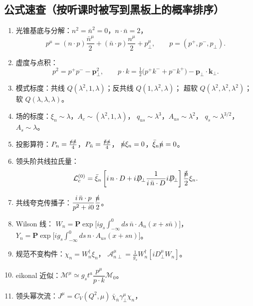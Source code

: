 \documentclass[UTF8,a4paper,11pt]{ctexart}
\theoremstyle{definition}
\theoremstyle{remark}
\theoremstyle{plain}
\newcommand{\nsl}{n\mkern-10.5mu/\mkern1.5mu}
\newcommand{\nbsl}{\bar{n}\mkern-10.5mu/\mkern1.5mu}
\newcommand{\Dsl}{D\mkern-11.5mu/}
\newcommand{\pperp}{\bm{p}_\perp}
\newcommand{\kperp}{\bm{k}_\perp}
\newcommand{\Pexp}{\mathbf{P}\exp}
\begin{document}
\subsection{公式速查（按听课时被写到黑板上的概率排序）}

\begin{enumerate}[label=\textbf{F\arabic*.}, leftmargin=1.3cm]
\item 光锥基底与分解：$n^2=\bar n^2=0$，$n\cdot\bar n=2$，
      \begin{equation}
        p^\mu=(n\cdot p)\frac{\bar n^\mu}{2}+(\bar n\cdot p)\frac{n^\mu}{2}+p_\perp^\mu ,
        \qquad
        p=(p^+,p^-,p_\perp) .
      \end{equation}
\item 虚度与点积：
      \begin{equation}
        p^2=p^+p^--\pperp^2 ,
        \qquad
        p\cdot k=\tfrac12\big(p^+k^-+p^-k^+\big)-\pperp\!\cdot\!\kperp .
      \end{equation}
\item 模式标度：共线 $Q(\lambda^2,1,\lambda)$；反共线 $Q(1,\lambda^2,\lambda)$；
      超软 $Q(\lambda^2,\lambda^2,\lambda^2)$；软 $Q(\lambda,\lambda,\lambda)$。
\item 场的标度：$\xi_n\sim\lambda$，$A_c\sim(\lambda^2,1,\lambda)$，
      $q_{us}\sim\lambda^3$，$A_{us}\sim\lambda^2$，
      $q_s\sim\lambda^{3/2}$，$A_s\sim\lambda$。
\item 投影算符：$P_n=\frac{\nsl\nbsl}{4}$，$P_{\bar n}=\frac{\nbsl\nsl}{4}$，
      $\nsl\xi_n=0$，$\bar\xi_n\nsl=0$。
\item 领头阶共线拉氏量：
      \begin{equation}
        \mathcal L_c^{(0)}=\bar\xi_n\left[i\,n\cdot D
        +i\Dsl_\perp\frac{1}{i\,\bar n\cdot D}i\Dsl_\perp\right]\frac{\nbsl}{2}\xi_n .
      \end{equation}
\item 共线夸克传播子：$\dfrac{i\,\bar n\cdot p}{p^2+i0}\dfrac{\nsl}{2}$。
\item Wilson 线：
      $W_n=\Pexp\big[ig_s\!\int_{-\infty}^0\!ds\,\bar n\cdot A_n(x+s\bar n)\big]$，
      $Y_n=\Pexp\big[ig_s\!\int_{-\infty}^0\!ds\,n\cdot A_{us}(x+sn)\big]$。
\item 规范不变构件：$\chi_n=W_n^\dagger\xi_n$，
      $\mathcal A_{n\perp}^\mu=\frac1{g_s}W_n^\dagger[iD_\perp^\mu W_n]$。
\item eikonal 近似：$\mathcal M^\mu\simeq g_st^a\dfrac{p^\mu}{p\cdot k}\mathcal M_0$。
\item 领头幂次流：$J^\mu=C_V(Q^2,\mu)\,\bar\chi_{\bar n}\gamma^\mu_\perp\chi_n$，

\end{enumerate}
\end{document}
